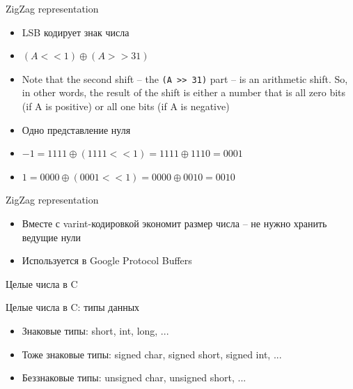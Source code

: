 \documentclass[10pt,pdf,hyperref={unicode}]{beamer}
\begin{document}
\begin{frame}{ZigZag representation}
    \begin{itemize}
        \item LSB кодирует знак числа
        \item $(A << 1) \mathbin{\oplus} (A >> 31)$
        \item Note that the second shift -- the \lstinline{(A >> 31)} part -- is an arithmetic shift. So, in other words, the result of the shift is either a number that is all zero bits (if A is positive) or all one bits (if A is negative)
        \item Одно представление нуля
        \item $-1 = 1111 \mathbin{\oplus} (1111 << 1) = 1111 \mathbin{\oplus} 1110 = 0001$
        \item $1 = 0000 \mathbin{\oplus} (0001 << 1) = 0000 \mathbin{\oplus} 0010 = 0010$
    \end{itemize}
\end{frame}

\begin{frame}{ZigZag representation}
    \begin{itemize}
        \item Вместе с varint-кодировкой экономит размер числа -- не нужно хранить ведущие нули
        \item Используется в Google Protocol Buffers
    \end{itemize}

    \begin{center}
    \end{center}
\end{frame}

\begin{frame}
    \begin{center}
        \large{Целые числа в C}
    \end{center}
\end{frame}

\begin{frame}{Целые числа в C: типы данных}
    \begin{itemize}
        \item Знаковые типы: short, int, long, ...
        \item Тоже знаковые типы: signed char, signed short, signed int, ...
        \item Беззнаковые типы: unsigned char, unsigned short, ...
    \end{itemize}
\end{frame}
\end{document}
